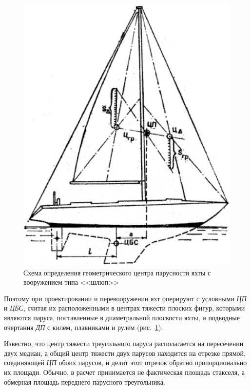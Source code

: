 \documentclass[a4paper, 12pt, twoside, final, book, russian, fittopage, cyremdash]{ncc}
\begin{document}
\begin{figure}[htb]
  \centering
  \includegraphics[scale=0.5]{0012.jpg}
  \caption{Схема определения геометрического центра парусности яхты с вооружением типа <<шлюп>>}
  \label{fig:12}
\end{figure}

Поэтому при проектировании и перевооружении яхт оперируют с условными \textit{ЦП} и \textit{ЦБС}, считая их расположенными в центрах тяжести плоских фигур, которыми являются паруса, поставленные в диаметральной плоскости яхты, и подводные очертания \textit{ДП} с килем, плавниками и рулем (рис.~\ref{fig:12}). 

Известно, что центр тяжести треугольного паруса располагается на пересечении двух медиан, а общий центр тяжести двух парусов находится на отрезке прямой, соединяющей \textit{ЦП} обоих парусов, и делит этот отрезок обратно пропорционально их площади. Обычно, в расчет принимается не фактическая площадь стакселя, а обмерная площадь переднего парусного треугольника. 
\end{document}
